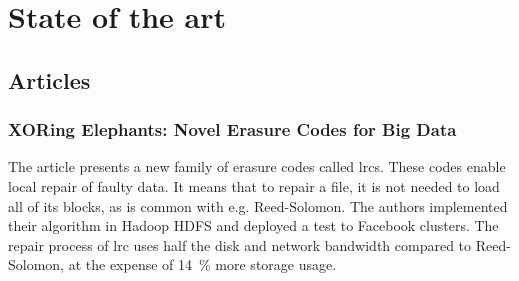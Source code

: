 \chapter{State of the art}

\section{Articles}

\subsection{XORing Elephants: Novel Erasure Codes for Big Data \autocite{XorbasVLDB}}


The article presents a new family of erasure codes called \acp{lrc}.
These codes enable local repair of faulty data.
It means that to repair a file, it is not needed to load all of its blocks, as is common with e.g. Reed-Solomon.  
The authors implemented their algorithm in Hadoop HDFS and deployed a test to Facebook clusters.
The repair process of \ac{lrc} uses half the disk and network bandwidth compared to Reed-Solomon, at the expense of \SI{14}{\percent} more storage usage.
